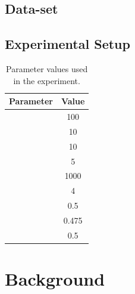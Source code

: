 \documentclass[a4paper,12pt]{article}
\begin{document}
    \subsection{Data-set}
    \subsection{Experimental Setup}
        \par{
            \begin{table}[ht]
                \centering
                    \small 
                    \begin{tabular}{ | c | c | }

                        \hline
                        \textbf{Parameter} & \textbf{Value} \\
                        \hline  
                        \nameref{subsubsec:mg} & 100 \\
                        \hline 
                        \nameref{subsubsec:kf} & 10 \\
                        \hline 
                        \nameref{subsubsec:mmd} & 10 \\
                        \hline 
                        \nameref{subsubsec:cmd} & 5 \\
                        \hline 
                        \nameref{subsubsec:ps} & 1000 \\
                        \hline 
                        \nameref{subsubsec:ts} & 4 \\
                        \hline 
                        \nameref{subsubsec:car} & 0.5 \\
                        \hline 
                        \nameref{subsubsec:mar} & 0.475 \\
                        \hline 
                        \nameref{subsubsec:har} & 0.5 \\
                        \hline 
                    \end{tabular}
                    \caption{Parameter values used in the experiment.} 
            \end{table} 
        }
       
\section{Background} \label{sec:background} 
\end{document}
